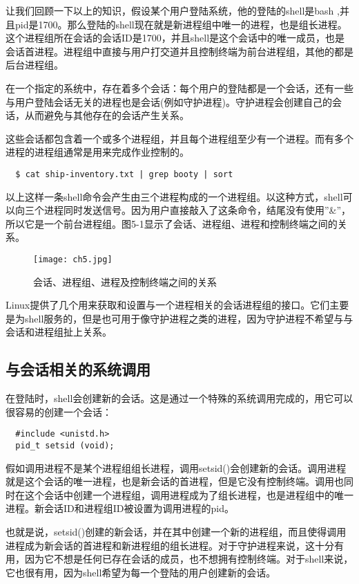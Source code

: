 让我们回顾一下以上的知识，假设某个用户登陆系统，他的登陆的shell是bash ,并且pid是1700。那么登陆的shell现在就是新进程组中唯一的进程，也是组长进程。这个进程组所在会话的会话ID是1700，并且shell是这个会话中的唯一成员，也是会话首进程。进程组中直接与用户打交道并且控制终端为前台进程组，其他的都是后台进程组。

在一个指定的系统中，存在着多个会话：每个用户的登陆都是一个会话，还有一些与用户登陆会话无关的进程也是会话(例如守护进程)。守护进程会创建自己的会话，从而避免与其他存在的会话产生关系。

这些会话都包含着一个或多个进程组，并且每个进程组至少有一个进程。而有多个进程的进程组通常是用来完成作业控制的。

\begin{verbatim}
  $ cat ship-inventory.txt | grep booty | sort
\end{verbatim}

以上这样一条shell命令会产生由三个进程构成的一个进程组。以这种方式，shell可以向三个进程同时发送信号。因为用户直接敲入了这条命令，结尾没有使用''\&''，所以它是一个前台进程组。图5-1显示了会话、进程组、进程和控制终端之间的关系。

\begin{figure}[htp]
  \centering
  \texttt{[image: ch5.jpg]}
  \caption{会话、进程组、进程及控制终端之间的关系}
\end{figure}
 
Linux提供了几个用来获取和设置与一个进程相关的会话进程组的接口。它们主要是为shell服务的，但是也可用于像守护进程之类的进程，因为守护进程不希望与与会话和进程组扯上关系。

\subsection{与会话相关的系统调用}

在登陆时，shell会创建新的会话。这是通过一个特殊的系统调用完成的，用它可以很容易的创建一个会话：

\begin{lstlisting}
  #include <unistd.h>
  pid_t setsid (void);
\end{lstlisting}

假如调用进程不是某个进程组组长进程，调用setsid()会创建新的会话。调用进程就是这个会话的唯一进程，也是新会话的首进程，但是它没有控制终端。调用也同时在这个会话中创建一个进程组，调用进程成为了组长进程，也是进程组中的唯一进程。新会话ID和进程组ID被设置为调用进程的pid。

也就是说，setsid()创建的新会话，并在其中创建一个新的进程组，而且使得调用进程成为新会话的首进程和新进程组的组长进程。对于守护进程来说，这十分有用，因为它不想是任何已存在会话的成员，也不想拥有控制终端。对于shell来说，它也很有用，因为shell希望为每一个登陆的用户创建新的会话。

